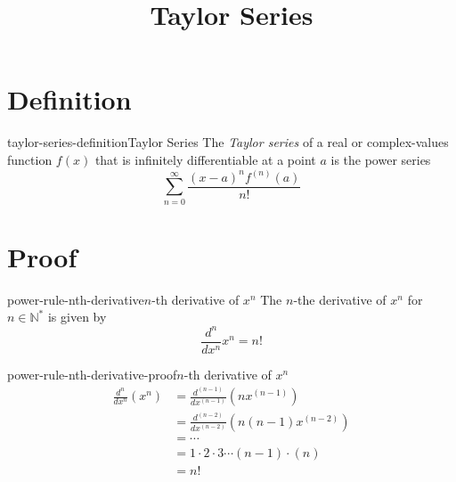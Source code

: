 \documentclass[preview]{standalone}
\begin{document}
\title{Taylor Series}
\genpage

\section{Definition}

\begin{snippetdefinition}{taylor-series-definition}{Taylor Series}
    The \textit{Taylor series} of a real or complex-values function \(f(x)\)
    that is infinitely differentiable at a point \(a\) is the power series
    \[
        \sum_{n=0}^{\infty}\frac{{(x-a)}^n f^{(n)}(a)}{n!}
    \]
\end{snippetdefinition}

\section{Proof}

\begin{snippetproposition}{power-rule-nth-derivative}{\(n\)-th derivative of \(x^n\)}
    The \(n\)-the derivative of \(x^n\) for \(n \in \mathbb{N}^*\)
    is given by
    \[
        \frac{d^n}{dx^n} x^n = n!
    \]
\end{snippetproposition}

\begin{snippetproof}{power-rule-nth-derivative-proof}{\(n\)-th derivative of \(x^n\)}
    \begin{align*}
        \frac{d^n}{dx^n}\left(x^n\right)
        &=\frac{d^{(n-1)}}{dx^{(n-1)}}\left(nx^{(n-1)}\right)\\
        &=\frac{d^{(n-2)}}{dx^{(n-2)}}\left(n(n-1)x^{(n-2)}\right)\\
        &=\cdots\\
        &=1\cdot 2 \cdot 3 \cdots (n-1) \cdot (n) \\
        &=n!
    \end{align*}
\end{snippetproof}
\end{document}
